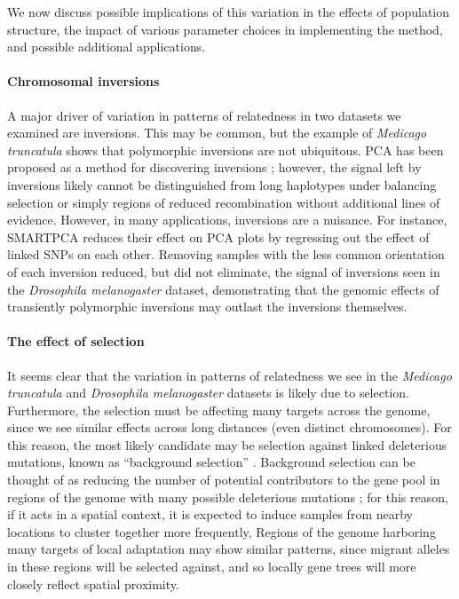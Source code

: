 \documentclass[11pt, oneside]{article}   	%
\begin{document}
We now discuss possible implications of this variation in the effects of population structure,
the impact of various parameter choices in implementing the method,
and possible additional applications.


\paragraph{Chromosomal inversions}
A major driver of variation in patterns of relatedness in two datasets we examined are inversions.
This may be common,
but the example of \textit{Medicago truncatula} shows that polymorphic inversions are not ubiquitous.
PCA has been proposed as a method for discovering inversions \citep{ma2012investigation};
however, the signal left by inversions likely cannot be distinguished from long haplotypes under balancing selection 
or simply regions of reduced recombination
without additional lines of evidence.
However, in many applications, inversions are a nuisance.
For instance, SMARTPCA \citep{patterson2006population} reduces their effect on PCA plots
by regressing out the effect of linked SNPs on each other.
Removing samples with the less common orientation of each inversion reduced,
but did not eliminate, the signal of inversions
seen in the \textit{Drosophila melanogaster} dataset,
demonstrating that the genomic effects of transiently polymorphic inversions
may outlast the inversions themselves.


\paragraph{The effect of selection}
It seems clear that the variation in patterns of relatedness we see in the \textit{Medicago truncatula} and \textit{Drosophila melanogaster} datasets
is likely due to selection.
Furthermore, 
the selection must be affecting many targets across the genome,
since we see similar effects across long distances (even distinct chromosomes).
For this reason, the most likely candidate may be selection against linked deleterious mutations, known as ``background selection'' \citep{charlesworth1993effect,charlesworth2013background}.
Background selection can be thought of as reducing the number of potential contributors to the gene pool in regions of the genome with many possible deleterious mutations \citep{hudson1995deleterious};
for this reason, if it acts in a spatial context, it is expected to induce samples from nearby locations to cluster together more frequently,
Regions of the genome harboring many targets of local adaptation may show similar patterns,
since migrant alleles in these regions will be selected against,
and so locally gene trees will more closely reflect spatial proximity.
\end{document}

